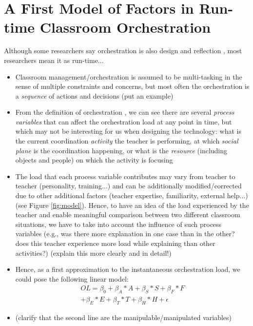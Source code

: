 \documentclass[10pt,journal,compsoc]{IEEEtran}
\begin{document}
\section{A First Model of Factors in Run-time Classroom Orchestration}
\label{sec:model}

Although some researchers say orchestration is also design and reflection \cite{Prieto2011}, most researchers mean it as run-time...

\begin{itemize}
\item Classroom management/orchestration is assumed to be multi-tasking \cite{Doyle2006} in the sense of multiple constraints and concerns, but most often the orchestration is a \textit{sequence} of actions and decisions (put an example)
\item From the definition of orchestration \cite{Dillenbourg2009}, we can see there are several \textit{process variables} that can affect the orchestration load at any point in time, but which may not be interesting for us when designing the technology: what is the current coordination \textit{activity} the teacher is performing, at which \textit{social plane} is the coordination happening, or what is the \textit{resource} (including objects and people) on which the activity is focusing
\item The load that each process variable contributes may vary from teacher to teacher (personality, training...) and can be additionally modified/corrected due to other additional factors (teacher expertise, familiarity, external help...) (see Figure \ref{fig:model}). Hence, to have an idea of the load experienced by the teacher and enable meaningful comparison between two different classroom situations, we have to take into account the influence of such process variables (e.g., was there more explanation in one case than in the other? does this teacher experience more load while explaining than other activities?) (explain this more clearly and in detail!)
\item Hence, as a first approximation to the instantaneous orchestration load, we could pose the following linear model:
\begin{multline}
\label{formOLScat}
OL = \beta_0 + \beta_A*A + \beta_S*S + \beta_F*F \\ + \beta_E*E + \beta_T*T + \beta_H*H + \epsilon
\end{multline}
\item (clarify that the second line are the manipulable/manipulated variables)

\end{itemize}
\end{document}
